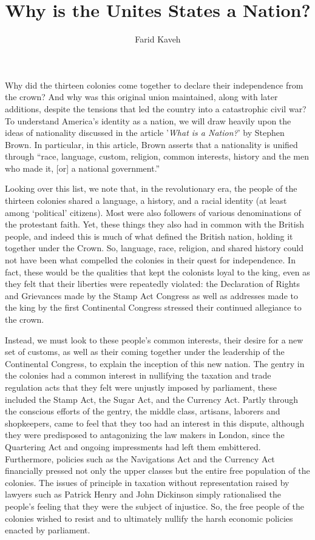 \documentclass[a4paper]{article}
\begin{document}
\title{Why is the Unites States a Nation?}
\subtitle{}
\author{Farid Kaveh}

\maketitle

Why did the thirteen colonies come together to declare their independence from the crown? And why was this original union maintained, along with later additions, despite the tensions that led the country into a catastrophic civil war? To understand America’s identity as a nation, we will draw heavily upon the ideas of nationality discussed in the article '\textit{What is a Nation?}' by Stephen Brown. In particular, in this article, Brown asserts that a nationality is unified through “race, language, custom, religion, common interests, history and the men who made it, [or] a national government.” \autocite[]{10.2307/30083977}

Looking over this list, we note that, in the revolutionary era, the people of the thirteen colonies shared a language, a history, and a racial identity (at least among ‘political’ citizens). Most were also followers of various denominations of the protestant faith. Yet, these things they also had in common with the British people, and indeed this is much of what defined the British nation, holding it together under the Crown. So, language, race, religion, and shared history could not have been what compelled the colonies in their quest for independence. In fact, these would be the qualities that kept the colonists loyal to the king, even as they felt that their liberties were repeatedly violated: the Declaration of Rights and Grievances made by the Stamp Act Congress as well as addresses made to the king by the first Continental Congress stressed their continued allegiance to the crown. \autocite[pp. 172-173, 158-159]{AmericanRep1}

Instead, we must look to these people’s common interests, their desire for a new set of customs, as well as their coming together under the leadership of the Continental Congress, to explain the inception of this new nation. The gentry in the colonies had a common interest in nullifying the taxation and trade regulation acts that they felt were unjustly imposed by parliament, these included the Stamp Act, the Sugar Act, and the Currency Act.\autocite[pp. 158-160]{AmericanRep1} Partly through the conscious efforts of the gentry, the middle class, artisans, laborers and shopkeepers, came to feel  that they too had an interest in this dispute, although they were predisposed to antagonizing the law makers in London, since the Quartering Act and ongoing impressments had left them embittered. Furthermore, policies such as the Navigations Act and the Currency Act financially pressed not only the upper classes but the entire free population of the colonies. The issues of principle in taxation without representation raised by lawyers such as Patrick Henry and John Dickinson simply rationalised the people’s feeling that they were the subject of injustice. So, the free people of the colonies wished to resist and to ultimately nullify the harsh economic policies enacted by parliament.
\end{document}
